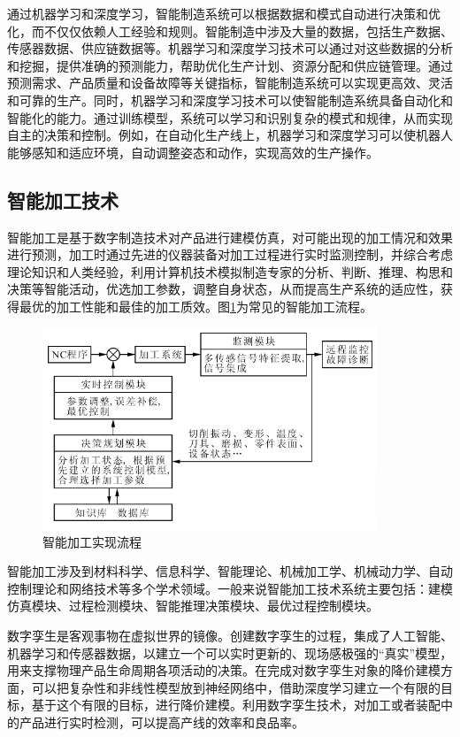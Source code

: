 \documentclass[lang=cn,12pt,bibtex,newtx,twoside,margintrue,citestyle=gb7714-2015, bibstyle=gb7714-2015]{elegantbook}
\begin{document}
通过机器学习和深度学习，智能制造系统可以根据数据和模式自动进行决策和优化，而不仅仅依赖人工经验和规则。智能制造中涉及大量的数据，包括生产数据、传感器数据、供应链数据等。机器学习和深度学习技术可以通过对这些数据的分析和挖掘，提供准确的预测能力，帮助优化生产计划、资源分配和供应链管理。通过预测需求、产品质量和设备故障等关键指标，智能制造系统可以实现更高效、灵活和可靠的生产。同时，机器学习和深度学习技术可以使智能制造系统具备自动化和智能化的能力。通过训练模型，系统可以学习和识别复杂的模式和规律，从而实现自主的决策和控制。例如，在自动化生产线上，机器学习和深度学习可以使机器人能够感知和适应环境，自动调整姿态和动作，实现高效的生产操作。

\subsection{智能加工技术}
\label{sec:orgea00db2}
智能加工是基于数字制造技术对产品进行建模仿真，对可能出现的加工情况和效果进行预测，加工时通过先进的仪器装备对加工过程进行实时监测控制，并综合考虑理论知识和人类经验，利用计算机技术模拟制造专家的分析、判断、推理、构思和决策等智能活动，优选加工参数，调整自身状态，从而提高生产系统的适应性，获得最优的加工性能和最佳的加工质效\cite{岳玮2015}。图\ref{2.6}为常见的智能加工流程。

\begin{figure}[htbp]
\centering
\includegraphics[angle=0,width=10cm]{./figure/2.6.png}
\caption{\label{2.6}智能加工实现流程}
\end{figure}

智能加工涉及到材料科学、信息科学、智能理论、机械加工学、机械动力学、自动控制理论和网络技术等多个学术领域。一般来说智能加工技术系统主要包括\cite{富宏亚2006}：建模仿真模块、过程检测模块、智能推理决策模块、最优过程控制模块。

数字孪生是客观事物在虚拟世界的镜像。创建数字孪生的过程，集成了人工智能、机器学习和传感器数据，以建立一个可以实时更新的、现场感极强的“真实”模型，用来支撑物理产品生命周期各项活动的决策。在完成对数字孪生对象的降价建模方面，可以把复杂性和非线性模型放到神经网络中，借助深度学习建立一个有限的目标，基于这个有限的目标，进行降价建模。利用数字孪生技术，对加工或者装配中的产品进行实时检测，可以提高产线的效率和良品率。
\end{document}
